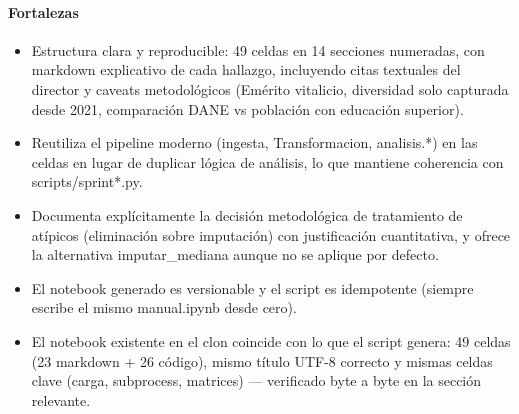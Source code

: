 \paragraph{Fortalezas}
\begin{itemize}
  \item Estructura clara y reproducible: 49 celdas en 14 secciones numeradas, con markdown explicativo de cada hallazgo, incluyendo citas textuales del director y caveats metodológicos (Emérito vitalicio, diversidad solo capturada desde 2021, comparación DANE vs población con educación superior).
  \item Reutiliza el pipeline moderno (ingesta, Transformacion, analisis.*) en las celdas en lugar de duplicar lógica de análisis, lo que mantiene coherencia con scripts/sprint*.py.
  \item Documenta explícitamente la decisión metodológica de tratamiento de atípicos (eliminación sobre imputación) con justificación cuantitativa, y ofrece la alternativa imputar\_mediana aunque no se aplique por defecto.
  \item El notebook generado es versionable y el script es idempotente (siempre escribe el mismo manual.ipynb desde cero).
  \item El notebook existente en el clon coincide con lo que el script genera: 49 celdas (23 markdown + 26 código), mismo título UTF-8 correcto y mismas celdas clave (carga, subprocess, matrices) --- verificado byte a byte en la sección relevante.
\end{itemize}

